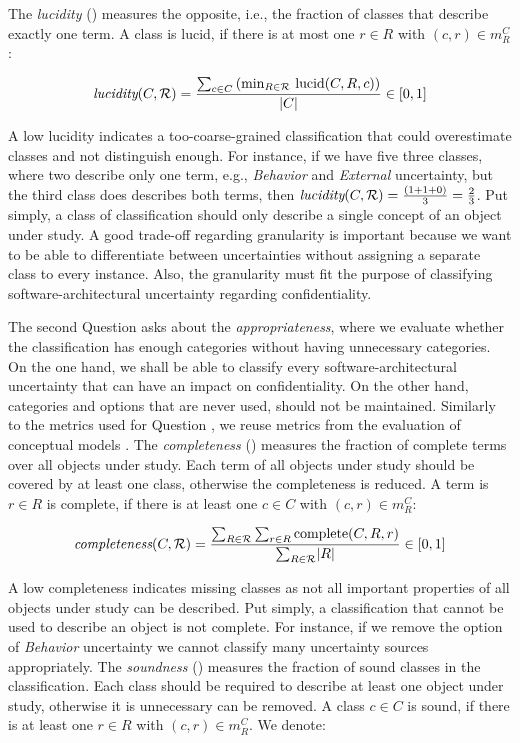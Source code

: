 The \emph{lucidity} (\label{gqm:text:m:1:1:2}) measures the opposite, i.e., the fraction of classes that describe exactly one term.
A class is lucid, if there is at most one $r \in R$ with $(c,r) \in m^C_R$:

\begin{equation*}
  {\emph{lucidity}}(C,\mathcal{R}) = \frac{\sum\nolimits_{c\in C}\,(\min\nolimits_{R\in\mathcal{R}}\,\text{lucid}(C,R,c))}{\lvert C \rvert} \in [0,1]
\end{equation*}

A low lucidity indicates a too-coarse-grained classification that could overestimate classes and not distinguish enough.
For instance, if we have five three classes, where two describe only one term, e.g., \emph{Behavior} and \emph{External} uncertainty, but the third class does describes both terms, then ${\emph{lucidity}}(C,\mathcal{R}) = \frac{(1 + 1 + 0)}{3} = \frac{2}{3}$.
Put simply, a class of classification should only describe a single concept of an object under study.
A good trade-off regarding granularity is important because we want to be able to differentiate between uncertainties without assigning a separate class to every instance.
Also, the granularity must fit the purpose of classifying software-architectural uncertainty regarding confidentiality.

\label{gqm:text:q:1:2}
The second Question  asks about the \emph{appropriateness}, where we evaluate whether the classification has enough categories without having unnecessary categories.
On the one hand, we shall be able to classify every software-architectural uncertainty that can have an impact on confidentiality.
On the other hand, categories and options that are never used, should not be maintained.
Similarly to the metrics used for Question , we reuse metrics from the evaluation of conceptual models \cite{kaplan_introducing_2022,ananieva_conceptual_2020}.
The \emph{completeness} (\label{gqm:text:m:1:2:1}) measures the fraction of complete terms over all objects under study.
Each term of all objects under study should be covered by at least one class, otherwise the completeness is reduced.
A term is $r \in R$ is complete, if there is at least one $c \in C$ with $(c,r) \in m^C_R$:

\begin{equation*}
  {\emph{completeness}}(C,\mathcal{R}) = \frac{\sum\nolimits_{R\in \mathcal{R}} \sum\nolimits_{r\in R} \text{complete}(C,R,r)}{\sum\nolimits_{R\in \mathcal{R}} \lvert R\rvert} \in [0,1]
\end{equation*}

A low completeness indicates missing classes as not all important properties of all objects under study can be described.
Put simply, a classification that cannot be used to describe an object is not complete.
For instance, if we remove the option of \emph{Behavior} uncertainty we cannot classify many uncertainty sources appropriately.
The \emph{soundness} (\label{gqm:text:m:1:2:2}) measures the fraction of sound classes in the classification.
Each class should be required to describe at least one object under study, otherwise it is unnecessary can be removed.
A class $c \in C$ is sound, if there is at least one $r \in R$ with $(c,r) \in m^C_R$.
We denote: 

